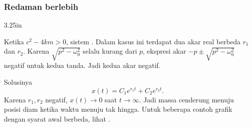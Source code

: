 \subsubsection{Redaman berlebih}

\begin{mywrapfig}[15]{3.25in}
\capstart
{}
\caption{Gerak teredam berlebih untuk beberapa syarat awal berbeda.\label{mv:overdampedfig}}
\end{mywrapfig}
%
%

Ketika $c^2 - 4km > 0$, sistem \emph{}. Dalam kasus ini terdapat dua akar real berbeda $r_1$ dan $r_2$. Karena $\sqrt{p^2 - \omega_0^2}$ selalu kurang dari $p$, ekspresi akar $-p \pm \sqrt{p^2 - \omega_0^2}$ negatif untuk kedua tanda. Jadi kedua akar negatif.

Solusinya
\begin{equation*}
x(t) = C_1 e^{r_1 t} + C_2 e^{r_2 t} .
\end{equation*}
Karena $r_1, r_2$ negatif, $x(t) \to 0$ saat $t \to \infty$. Jadi massa cenderung menuju posisi diam ketika waktu menuju tak hingga. Untuk beberapa contoh grafik dengan syarat awal berbeda, lihat .


